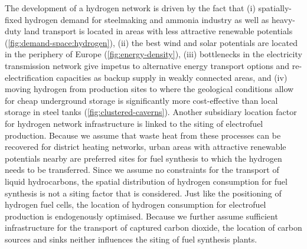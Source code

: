 The development of a hydrogen network is driven by the fact that (i)
spatially-fixed hydrogen demand for steelmaking and ammonia industry as well as
heavy-duty land transport is located in areas with less attractive renewable
potentials (\cref{fig:demand-space:hydrogen}), (ii) the best wind and solar
potentials are located in the periphery of Europe (\cref{fig:energy-density}),
(iii) bottlenecks in the electricity transmission network give impetus to
alternative energy transport options and re-electrification capacities as backup
supply in weakly connected areas, and (iv) moving hydrogen from production sites
to where the geological conditions allow for cheap underground storage is
significantly more cost-effective than local storage in steel tanks
(\cref{fig:clustered-caverns}). Another subsidiary location factor for hydrogen
network infrastructure is linked to the siting of electrofuel production.
Because we assume that waste heat from these processes can be recovered for
district heating networks, urban areas with attractive renewable potentials
nearby are preferred sites for fuel synthesis to which the hydrogen needs to be
transferred. Since we assume no constraints for the transport of liquid
hydrocarbons, the spatial distribution of hydrogen consumption for fuel
synthesis is not a siting factor that is considered. Just like the positioning
of hydrogen fuel cells, the location of hydrogen consumption for electrofuel
production is endogenously optimised. Because we further assume sufficient
infrastructure for the transport of captured carbon dioxide, the location of
carbon sources and sinks neither influences the siting of fuel synthesis plants.

